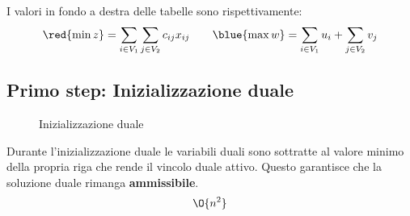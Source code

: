 \documentclass[\main/main.tex]{subfiles}
\begin{document}
I valori in fondo a destra delle tabelle sono rispettivamente:
\[
	\red{\min z} = \sum_{i \in V_1} \sum_{j \in V_2} c_{ij}x_{ij} \qquad \blue{\max w} = \sum_{i\in V_1} u_i + \sum_{j \in V_2} v_j
\]
\clearpage
\subsection{Primo step: Inizializzazione duale}
\begin{figure}
	\begin{algorithm}[H]
		\SetAlgoLined
		\caption{Inizializzazione duale}
	\end{algorithm}
\end{figure}
\begin{complexity}
	Durante l'inizializzazione duale le variabili duali sono sottratte al valore minimo della propria riga che rende il vincolo duale attivo. Questo garantisce che la soluzione duale rimanga \textbf{ammissibile}.
	\[\O{n^2}\]
\end{complexity}
\end{document}
